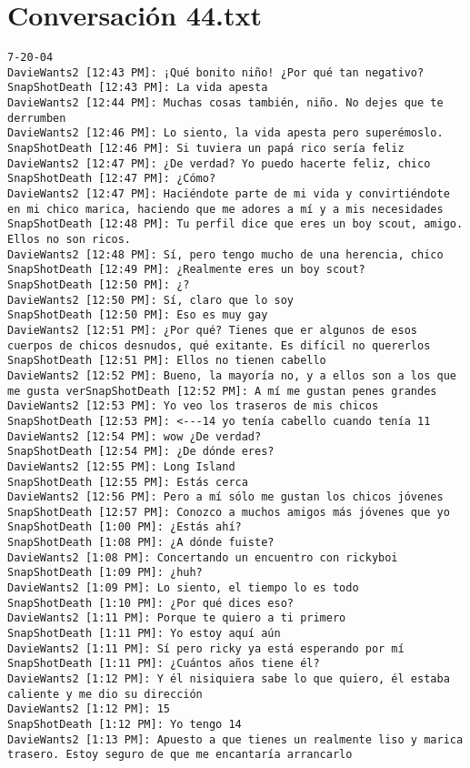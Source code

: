 \section{Conversaci\'on 44.txt}

\begin{verbatim}
7-20-04
DavieWants2 [12:43 PM]: ¡Qué bonito niño! ¿Por qué tan negativo? 
SnapShotDeath [12:43 PM]: La vida apesta 
DavieWants2 [12:44 PM]: Muchas cosas también, niño. No dejes que te derrumben 
DavieWants2 [12:46 PM]: Lo siento, la vida apesta pero superémoslo. 
SnapShotDeath [12:46 PM]: Si tuviera un papá rico sería feliz
DavieWants2 [12:47 PM]: ¿De verdad? Yo puedo hacerte feliz, chico 
SnapShotDeath [12:47 PM]: ¿Cómo?
DavieWants2 [12:47 PM]: Haciéndote parte de mi vida y convirtiéndote en mi chico marica, haciendo que me adores a mí y a mis necesidades 
SnapShotDeath [12:48 PM]: Tu perfil dice que eres un boy scout, amigo. Ellos no son ricos. 
DavieWants2 [12:48 PM]: Sí, pero tengo mucho de una herencia, chico 
SnapShotDeath [12:49 PM]: ¿Realmente eres un boy scout?
SnapShotDeath [12:50 PM]: ¿? 
DavieWants2 [12:50 PM]: Sí, claro que lo soy 
SnapShotDeath [12:50 PM]: Eso es muy gay
DavieWants2 [12:51 PM]: ¿Por qué? Tienes que er algunos de esos cuerpos de chicos desnudos, qué exitante. Es difícil no quererlos 
SnapShotDeath [12:51 PM]: Ellos no tienen cabello
DavieWants2 [12:52 PM]: Bueno, la mayoría no, y a ellos son a los que me gusta verSnapShotDeath [12:52 PM]: A mí me gustan penes grandes 
DavieWants2 [12:53 PM]: Yo veo los traseros de mis chicos
SnapShotDeath [12:53 PM]: <---14 yo tenía cabello cuando tenía 11 
DavieWants2 [12:54 PM]: wow ¿De verdad? 
SnapShotDeath [12:54 PM]: ¿De dónde eres? 
DavieWants2 [12:55 PM]: Long Island 
SnapShotDeath [12:55 PM]: Estás cerca 
DavieWants2 [12:56 PM]: Pero a mí sólo me gustan los chicos jóvenes 
SnapShotDeath [12:57 PM]: Conozco a muchos amigos más jóvenes que yo 
SnapShotDeath [1:00 PM]: ¿Estás ahí? 
SnapShotDeath [1:08 PM]: ¿A dónde fuiste? 
DavieWants2 [1:08 PM]: Concertando un encuentro con rickyboi 
SnapShotDeath [1:09 PM]: ¿huh? 
DavieWants2 [1:09 PM]: Lo siento, el tiempo lo es todo
SnapShotDeath [1:10 PM]: ¿Por qué dices eso? 
DavieWants2 [1:11 PM]: Porque te quiero a ti primero 
SnapShotDeath [1:11 PM]: Yo estoy aquí aún 
DavieWants2 [1:11 PM]: Sí pero ricky ya está esperando por mí 
SnapShotDeath [1:11 PM]: ¿Cuántos años tiene él? 
DavieWants2 [1:12 PM]: Y él nisiquiera sabe lo que quiero, él estaba caliente y me dio su dirección 
DavieWants2 [1:12 PM]: 15 
SnapShotDeath [1:12 PM]: Yo tengo 14 
DavieWants2 [1:13 PM]: Apuesto a que tienes un realmente liso y marica trasero. Estoy seguro de que me encantaría arrancarlo 

\end{verbatim}
